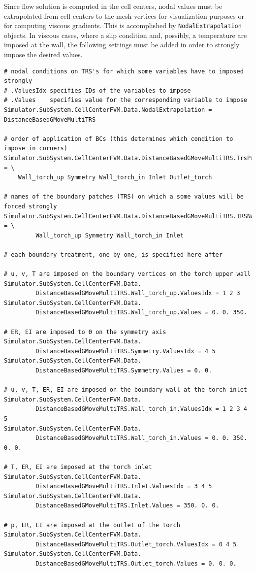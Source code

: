 \documentclass[11pt]{article}
\begin{document}
Since flow solution is computed in the cell centers, nodal values must be extrapolated from cell centers 
to the mesh vertices for visualization purposes or for computing viscous gradients. This is accomplished by 
{\tt NodalExtrapolation} objects. In viscous cases, where a slip condition and, possibly, a temperature 
are imposed at the wall, the following settings must be added in order to strongly impose the desired values.

\begin{verbatim}
# nodal conditions on TRS's for which some variables have to imposed strongly 
# .ValuesIdx specifies IDs of the variables to impose
# .Values    specifies value for the corresponding variable to impose
Simulator.SubSystem.CellCenterFVM.Data.NodalExtrapolation = DistanceBasedGMoveMultiTRS

# order of application of BCs (this determines which condition to impose in corners)
Simulator.SubSystem.CellCenterFVM.Data.DistanceBasedGMoveMultiTRS.TrsPriorityList = \
 	Wall_torch_up Symmetry Wall_torch_in Inlet Outlet_torch

# names of the boundary patches (TRS) on which a some values will be forced strongly
Simulator.SubSystem.CellCenterFVM.Data.DistanceBasedGMoveMultiTRS.TRSName = \
         Wall_torch_up Symmetry Wall_torch_in Inlet

# each boundary treatment, one by one, is specified here after

# u, v, T are imposed on the boundary vertices on the torch upper wall
Simulator.SubSystem.CellCenterFVM.Data.
         DistanceBasedGMoveMultiTRS.Wall_torch_up.ValuesIdx = 1 2 3     
Simulator.SubSystem.CellCenterFVM.Data.
         DistanceBasedGMoveMultiTRS.Wall_torch_up.Values = 0. 0. 350. 
 
# ER, EI are imposed to 0 on the symmetry axis
Simulator.SubSystem.CellCenterFVM.Data.
         DistanceBasedGMoveMultiTRS.Symmetry.ValuesIdx = 4 5    
Simulator.SubSystem.CellCenterFVM.Data.
         DistanceBasedGMoveMultiTRS.Symmetry.Values = 0. 0.

# u, v, T, ER, EI are imposed on the boundary wall at the torch inlet
Simulator.SubSystem.CellCenterFVM.Data.
         DistanceBasedGMoveMultiTRS.Wall_torch_in.ValuesIdx = 1 2 3 4 5 
Simulator.SubSystem.CellCenterFVM.Data.
         DistanceBasedGMoveMultiTRS.Wall_torch_in.Values = 0. 0. 350. 0. 0.

# T, ER, EI are imposed at the torch inlet
Simulator.SubSystem.CellCenterFVM.Data.
         DistanceBasedGMoveMultiTRS.Inlet.ValuesIdx = 3 4 5
Simulator.SubSystem.CellCenterFVM.Data.
         DistanceBasedGMoveMultiTRS.Inlet.Values = 350. 0. 0.

# p, ER, EI are imposed at the outlet of the torch
Simulator.SubSystem.CellCenterFVM.Data.
         DistanceBasedGMoveMultiTRS.Outlet_torch.ValuesIdx = 0 4 5
Simulator.SubSystem.CellCenterFVM.Data.
         DistanceBasedGMoveMultiTRS.Outlet_torch.Values = 0. 0. 0.
\end{verbatim}
\end{document}

